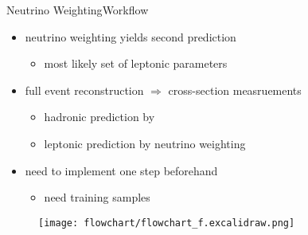\documentclass[9pt, aspectratio=169]{beamer}
\begin{document}
\begin{frame}{Neutrino Weighting}{Workflow}
	\begin{minipage}{.60\textwidth}
		\begin{itemize}
			\item neutrino weighting yields second prediction
			\begin{itemize}
				\item most likely set of leptonic parameters
			\end{itemize}
			\item full event reconstruction $\Rightarrow$ cross-section measruements
			\begin{itemize}
				\item hadronic prediction by \spanet
				\item leptonic prediction by neutrino weighting
			\end{itemize}
			\item need to implement one step beforehand
			\begin{itemize}
				\item need training samples
			\end{itemize}
		\end{itemize}
	\end{minipage}\hfill
	\begin{minipage}{.2\textwidth}
		\begin{figure}
			\centering
			\texttt{[image: flowchart/flowchart\_f.excalidraw.png]}
		\end{figure}
	\end{minipage}
\end{frame}
\end{document}
